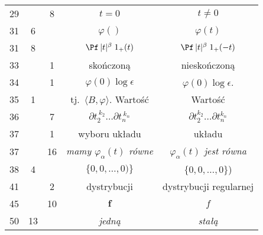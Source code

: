 \documentclass[a4paper,11pt]{article}
\numberwithin{equation}{section}
\begin{document}
\begin{center}
\begin{tabular}{|c|c|c|c|c|}
    29  & & \hphantom{0}8 & $t = 0$ & $t \neq 0$ \\
    31  & \hphantom{0}6 & & $\varphi( )$ & $\varphi( t )$ \\
    31  & \hphantom{0}8 & & $\Pf \, | t |^{ \beta } \; 1_{ + }( t )$
           & $\Pf \, | t |^{ \beta } \; 1_{ + }( -t )$ \\
    33  & & \hphantom{0}1 & skończoną & nieskończoną \\
    34  & & \hphantom{0}1 & $\varphi( 0 ) \log \epsilon$ & $\varphi( 0 ) \log \epsilon$. \\
    35 & \hphantom{0}1 & & tj.~$\langle B, \varphi \rangle$. Wartość & Wartość \\
    36 & & \hphantom{0}7 & $\partial t_{ 2 }^{ \: k_{ 2 } } \ldots \partial t_{ n }^{ \: k_{ n } }$
           & $\partial t_{ 2 }^{ k_{ 2 } } \ldots \partial t_{ n }^{ k_{ n } }$ \\
    37 & & \hphantom{0}1 & wyboru układu & układu \\
    37 & & 16 & \textit{mamy $\varphi_{ \alpha }( t )$ równe}
           & \textit{$\varphi_{ \alpha }( t )$ jest równa} \\
    38  & \hphantom{0}4 & & $\{ 0, 0, \ldots, 0 ) \}$ & $\{ 0, 0, \ldots, 0 \}$) \\
    41  & & \hphantom{0}2 & dystrybucji & dystrybucji regularnej \\
    45  & & 10 & $\boldsymbol{f}$ & $f$ \\
    50  & 13 & & \textit{jedną} & \textit{stałą} \\
    \hline
  \end{tabular}




\end{center}
\end{document}
